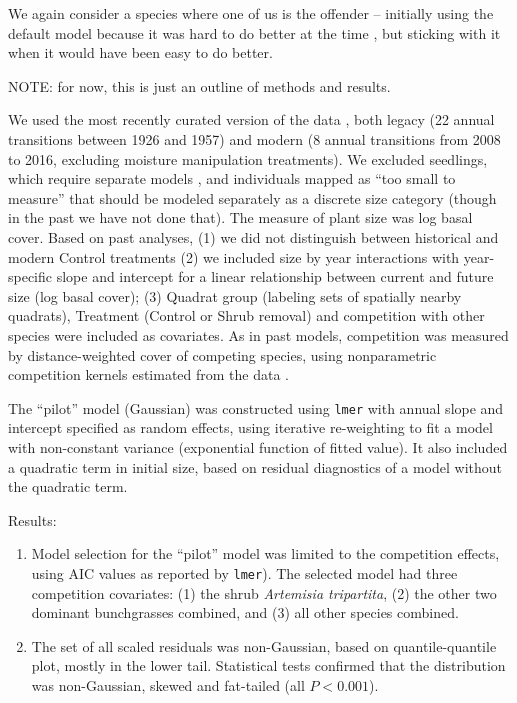 \documentclass[11pt]{article}
\begin{document}
{We again consider a species where one of us is the offender -- initially using the default model because 
it was hard to do better at the time \citep{adler-etal-2010}, but sticking with it 
\citep[e.g.,][]{Tredennick2018, Adler-2018} when it would have been easy to do better.   

NOTE: for now, this is just an outline of methods and results. 

We used the most recently curated version of the data \citep[][at doi.org/10.5061/dryad.96dn293]{Adler-2018},
both legacy (22 annual transitions between 1926 and 1957) and modern (8 annual transitions from
2008 to 2016, excluding moisture manipulation treatments). We excluded seedlings, which require separate models
\citep{Chu-2014a, Chu-2015, snyder-ellner-2018}, and individuals mapped as ``too small to measure'' that should be modeled separately
as a discrete size category (though in the past we have not done that). The measure of plant size was log basal cover. 
Based on past analyses, (1) we did not distinguish between historical and 
modern Control treatments \citep{Adler-2018} (2) we included size by year interactions with year-specific slope and intercept
for a linear relationship between current and future size (log basal cover); (3) Quadrat group (labeling sets of spatially
nearby quadrats), Treatment (Control or Shrub removal) and competition with other species were included as covariates. 
As in past models, competition was measured by distance-weighted cover of competing species, using nonparametric competition
kernels estimated from the data \citep{Teller-2016}. 

The ``pilot'' model (Gaussian) was constructed using \texttt{lmer} with annual slope and intercept specified 
as random effects, using iterative re-weighting to fit a model with non-constant variance (exponential function of fitted value). 
It also included a quadratic term in initial size, based on residual diagnostics of a model without the quadratic term. 

Results: \begin{enumerate}

\item Model selection for the ``pilot'' model was limited to the competition effects,  
using AIC values as reported by \texttt{lmer}). The selected model had  
three competition covariates: (1) the shrub \emph{Artemisia tripartita}, (2) the other two dominant 
bunchgrasses combined, and (3) all other species combined. 

\item The set of all scaled residuals was non-Gaussian, based on quantile-quantile plot, mostly in the lower tail. Statistical tests
confirmed that the distribution was non-Gaussian, skewed and fat-tailed (all $P<0.001$). 


\end{enumerate}}
\end{document}
